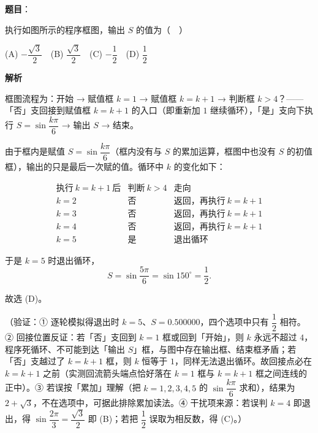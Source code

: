 \begin{answer}

\textbf{题目}：

执行如图所示的程序框图，输出 \(S\) 的值为（　）
\nopagebreak[4]
\begin{center}\end{center}
\nopagebreak[4]
(A) \(-\dfrac{\sqrt{3}}{2}\)　(B) \(\dfrac{\sqrt{3}}{2}\)　(C) \(-\dfrac{1}{2}\)　(D) \(\dfrac{1}{2}\)

\textbf{解析}

框图流程为：开始 → 赋值框 \(k=1\) → 赋值框 \(k=k+1\) → 判断框 \(k>4\)？——「否」支回接到赋值框 \(k=k+1\) 的入口（即重新加 \(1\) 继续循环），「是」支向下执行 \(S=\sin\dfrac{k\pi}{6}\) → 输出 \(S\) → 结束。

由于框内是赋值 \(S=\sin\dfrac{k\pi}{6}\)（框内没有与 \(S\) 的累加运算，框图中也没有 \(S\) 的初值框），输出的只是最后一次赋的值。循环中 \(k\) 的变化如下：

\nopagebreak[4]
\[
\begin{array}{c|c|l}
\text{执行}\ k=k+1\ \text{后} & \text{判断}\ k>4 & \text{走向} \\ \hline
k=2 & \text{否} & \text{返回，再执行}\ k=k+1 \\
k=3 & \text{否} & \text{返回，再执行}\ k=k+1 \\
k=4 & \text{否} & \text{返回，再执行}\ k=k+1 \\
k=5 & \text{是} & \text{退出循环}
\end{array}
\]

于是 \(k=5\) 时退出循环，
\nopagebreak[4]
\[
S=\sin\dfrac{5\pi}{6}=\sin 150^{\circ}=\dfrac{1}{2}.
\]

故选 (D)。

（验证：① 逐轮模拟得退出时 \(k=5\)、\(S=0.500000\)，四个选项中只有 \(\dfrac{1}{2}\) 相符。② 回接位置反证：若「否」支回到 \(k=1\) 框或回到「开始」，则 \(k\) 永远不超过 \(4\)，程序死循环、不可能到达「输出 \(S\)」框，与图中存在输出框、结束框矛盾；若「否」支越过了 \(k=k+1\) 框，则 \(k\) 恒等于 \(1\)，同样无法退出循环。故回接点必在 \(k=k+1\) 之前（实测回流箭头端点恰好落在 \(k=1\) 框与 \(k=k+1\) 框之间连线的正中）。③ 若误按「累加」理解（把 \(k=1,2,3,4,5\) 的 \(\sin\dfrac{k\pi}{6}\) 求和），结果为 \(2+\sqrt{3}\)，不在选项中，可据此排除累加读法。④ 干扰项来源：若误判 \(k=4\) 即退出，得 \(\sin\dfrac{2\pi}{3}=\dfrac{\sqrt{3}}{2}\) 即 (B)；若把 \(\dfrac{1}{2}\) 误取为相反数，得 (C)。）


\end{answer}
